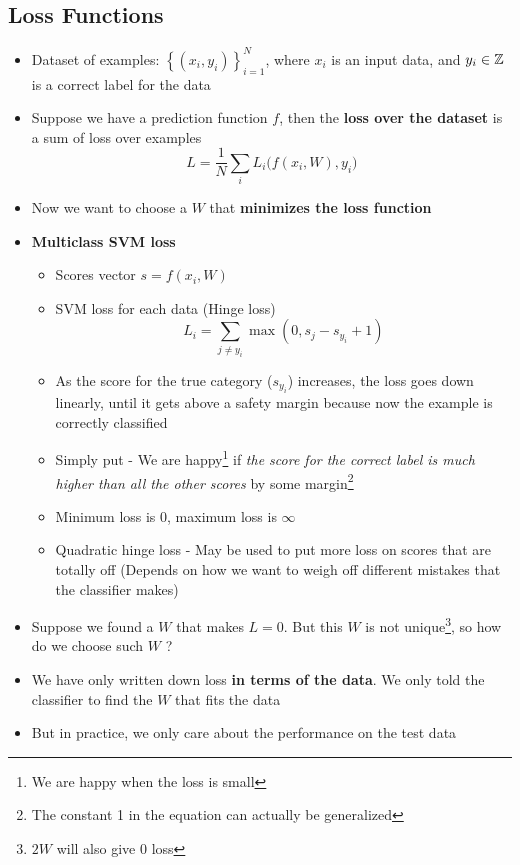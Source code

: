\subsection{Loss Functions}
\begin{itemize}
	\item Dataset of examples: $\left\{(x_i, y_i)\right\}_{i=1}^N$, where $x_i$ is an input data, and $y_i \in \mathbb{Z}$ is a correct label for the data
	\item Suppose we have a prediction function $f$, then the \textbf{loss over the dataset} is a sum of loss over examples
	$$L = \frac{1}{N} \sum_{i} L_i\big(f(x_i, W), y_i\big)$$
	\item Now we want to choose a $W$ that \textbf{minimizes the loss function}
	\item \textbf{Multiclass SVM loss}
	\begin{itemize}
		\item Scores vector $s = f(x_i, W)$
		\item SVM loss for each data (Hinge loss)
		$$L_i = \sum_{j \neq y_i} \max\left(0, s_j - s_{y_i}+1\right)$$
		\item As the score for the true category ($s_{y_i}$) increases, the loss goes down linearly, until it gets above a safety margin because now the example is correctly classified
		\item Simply put - We are happy\footnote{We are happy when the loss is small} if \textit{the score for the correct label is much higher than all the other scores} by some margin\footnote{The constant 1 in the equation can actually be generalized}
		\item Minimum loss is 0, maximum loss is $\infty$
		\item Quadratic hinge loss - May be used to put more loss on scores that are totally off (Depends on how we want to weigh off different mistakes that the classifier makes)
	\end{itemize}
	\item Suppose we found a $W$ that makes $L = 0$. But this $W$ is not unique\footnote{$2W$ will also give 0 loss}, so how do we choose such $W$ ?
	\item We have only written down loss \textbf{in terms of the data}. We only told the classifier to find the $W$ that fits the data
	\item But in practice, we only care about the performance on the test data
\end{itemize}


